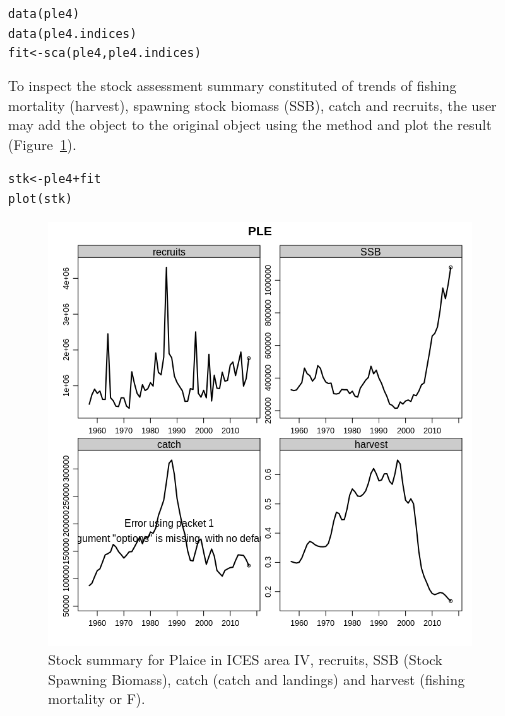 \documentclass[a4paper,english,10pt]{article}\usepackage[]{graphicx}\usepackage[]{color}
\makeatletter
\newcommand{\hlopt}[1]{\textcolor[rgb]{0.196,0.196,0.196}{#1}}%
\newcommand{\hlstd}[1]{\textcolor[rgb]{0.196,0.196,0.196}{#1}}%
\newcommand{\hlkwb}[1]{\textcolor[rgb]{0.627,0,0.314}{#1}}%
\newcommand{\hlkwd}[1]{\textcolor[rgb]{0.78,0.227,0.412}{#1}}%
\newenvironment{kframe}{%
 \def\at@end@of@kframe{}%
 \ifinner\ifhmode%
  \def\at@end@of@kframe{\end{minipage}}%
  \begin{minipage}{\columnwidth}%
 \fi\fi%
 \def\FrameCommand##1{\hskip\@totalleftmargin \hskip-\fboxsep
 \colorbox{shadecolor}{##1}\hskip-\fboxsep
     \hskip-\linewidth \hskip-\@totalleftmargin \hskip\columnwidth}%
 \MakeFramed {\advance\hsize-\width
   \@totalleftmargin\z@ \linewidth\hsize
   \@setminipage}}%
 {\par\unskip\endMakeFramed%
 \at@end@of@kframe}
\newenvironment{knitrout}{}{} %
\makeatother
\begin{document}
\begin{knitrout}
\color{fgcolor}\begin{kframe}
\begin{alltt}
\hlkwd{data}\hlstd{(ple4)}
\hlkwd{data}\hlstd{(ple4.indices)}
\hlstd{fit} \hlkwb{<-} \hlkwd{sca}\hlstd{(ple4, ple4.indices)}
\end{alltt}
\end{kframe}
\end{knitrout}

To inspect the stock assessment summary constituted of trends of fishing mortality (harvest), spawning stock biomass (SSB), catch and recruits, the user may add the  object to the original  object using the \code{+} method and plot the result (Figure~\ref{fig:summ}).

\begin{knitrout}
\color{fgcolor}\begin{kframe}
\begin{alltt}
\hlstd{stk} \hlkwb{<-} \hlstd{ple4} \hlopt{+} \hlstd{fit}
\hlkwd{plot}\hlstd{(stk)}
\end{alltt}
\end{kframe}\begin{figure}[H]

{\centering \includegraphics[width=.9\linewidth]{figure/summ-1} 

}

\caption[Stock summary for Plaice in ICES area IV, recruits, SSB (Stock Spawning Biomass), catch (catch and landings) and harvest (fishing mortality or F)]{Stock summary for Plaice in ICES area IV, recruits, SSB (Stock Spawning Biomass), catch (catch and landings) and harvest (fishing mortality or F).}\label{fig:summ}
\end{figure}


\end{knitrout}
\end{document}
